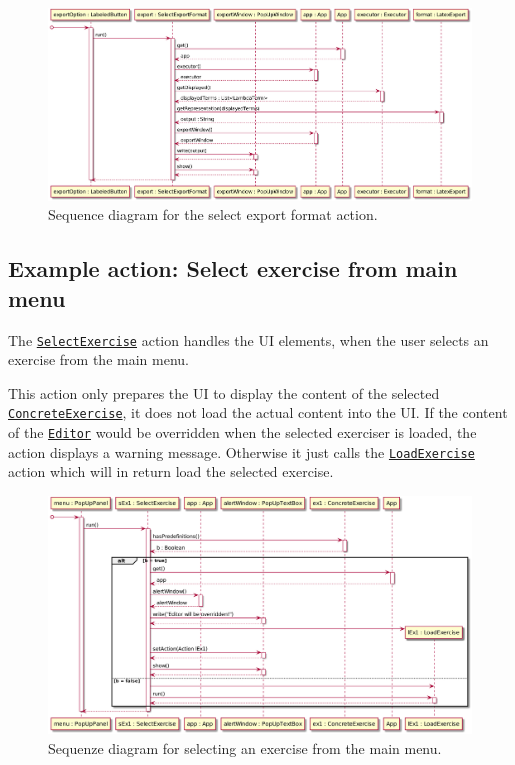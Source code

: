 \begin{figure}[H]
	\centering
	\includegraphics[width=\textwidth]{sequenceDiagrams/exportOutput.png}
	\caption{Sequence diagram for the select export format action.}
\end{figure}

\subsection{Example action: Select exercise from main menu}
The \texttt{\hyperref[type:edu.kit.wavelength.client.view.action.SelectExercise]{SelectExercise}} 
action handles the UI elements, when the user selects an exercise from the main menu.

This action only prepares the UI to display the content of the selected \texttt{\hyperref[type:edu.kit.wavelength.client.view.exercise.ConcreteExercise]{ConcreteExercise}}, 
it does not load the actual content into the UI. If the content of the \texttt{\hyperref[type:edu.kit.wavelength.client.view.webui.component.Editor]{Editor}} would 
be overridden when the selected exerciser is loaded, the action displays a warning
message. Otherwise it just calls the \texttt{\hyperref[type:edu.kit.wavelength.client.view.action.LoadExercise]{LoadExercise}} 
action which will in return load the selected exercise.

\begin{figure}[H]
	\centering
	\includegraphics[width=\textwidth]{sequenceDiagrams/selectExercise.png}
	\caption{Sequenze diagram for selecting an exercise from the main menu.}
\end{figure}

